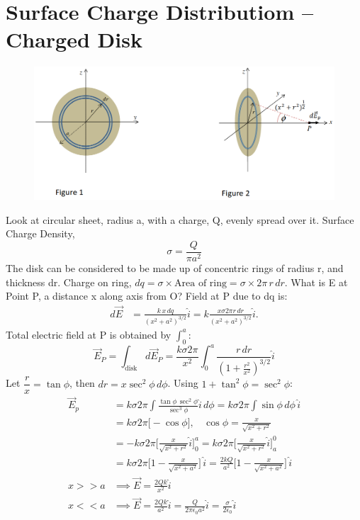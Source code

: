 \documentclass[a4paper, 11pt, normalem]{report}
\begin{document}
\section{Surface Charge Distributiom -- Charged Disk}
\begin{figure}[H]
    \centering
    \includegraphics[scale=0.4]{R1.png}
\end{figure}
Look at circular sheet, radius a, with a charge, Q, evenly spread over it.
Surface Charge Density,
\begin{equation}
    \sigma = \dfrac{Q}{\pi a^{2}}
\end{equation}
The disk can be considered to be made up of concentric rings of radius r, and thickness dr.
Charge on ring, $dq = \sigma \times \text{Area of ring} = \sigma \times 2\pi \, r \, dr$.
What is E at Point P, a distance x along axis from O?
Field at P due to dq is:
\begin{align}
    d\vec{E} &= \frac{k \, x \, dq}{(x^{2} + a^{2})^{3/2}} \hat{i} = k \frac{x \sigma 2\pi r \, dr}{(x^{2} + a^{2})^{3/2}} \hat{i}.
\end{align}
Total electric field at P is obtained by $\int_{0}^{a}$:
\begin{equation}
    \vec{E}_{P} = \int_{\text{disk}} d\vec{E}_{P} = \frac{k \sigma 2\pi}{x^{2}} \int_{0}^{a} \frac{r \, dr}{(1 + \tfrac{r^{2}}{x^{2}})^{3/2}} \hat{i}
\end{equation}
Let $\dfrac{r}{x} = \tan\phi$, then $dr = x\sec^{2}\phi \, d\phi$.
Using $1 + \tan^{2}\phi = \sec^{2}\phi$:
\begin{align}
    \vec{E}_p &= k \sigma 2\pi \int \frac{\tan\phi \, \sec^{2}\phi}{\sec^{3}\phi} \hat{i} \, d\phi = k \sigma 2\pi \int \sin\phi \, d\phi \, \hat{i} \\
              &= k \sigma 2\pi \big[-\cos\phi \big], ~~~~ \cos\phi = \frac{x}{\sqrt{x^{2} + r^{2}}} \\
              &= -k \sigma 2\pi \Big[\frac{x}{\sqrt{x^{2} + r^{2}}} \hat{i} \Big]_{0}^{a} = k \sigma 2\pi \Big[\frac{x}{\sqrt{x^{2} + r^{2}}} \hat{i} \Big]_{a}^{0} \\
              &= k \sigma 2\pi \Big[1 - \frac{x}{\sqrt{x^{2} + a^{2}}} \Big] \, \hat{i} = \frac{2 k Q}{a^{2}} \Big[1 - \frac{x}{\sqrt{x^{2} + a^{2}}} \Big] \, \hat{i}\\
    x >> a &\implies \vec{E} = \frac{2Qk}{x^{2}} \hat{i} \\
    x << a &\implies \vec{E} = \frac{2Qk}{a^{2}} \hat{i} = \frac{Q}{2\pi \epsilon_{0} a^{2}} \hat{i} = \frac{\sigma}{2\epsilon_{0}} \hat{i}
\end{align}
\end{document}
